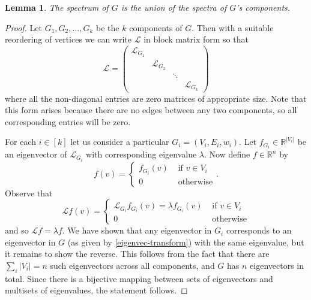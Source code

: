 \documentclass[a4paper,11pt]{article}
\newtheorem{lemma}[theorem]{Lemma}
\theoremstyle{definition}
\newcommand{\R}{\mathbb{R}}
\renewcommand{\L}{\mathcal{L}}
\begin{document}
\begin{lemma}\label{spectrum-union}
The spectrum of $G$ is the union of the spectra of $G$'s components.
\end{lemma}
\begin{proof}
Let $G_1, G_2, \dots, G_k$ be the $k$ components of $G$. Then with a suitable reordering of vertices we can write $\L$ in block matrix form so that
\[
\L = \begin{pmatrix}\L_{G_1} \\ & \L_{G_2} \\ & & \ddots \\ & & & \L_{G_k} \end{pmatrix}
\]
where all the non-diagonal entries are zero matrices of appropriate size. Note that this form arises because there are no edges between any two components, so all corresponding entries will be zero.

For each $i \in [k]$ let us consider a particular $G_i = (V_i, E_i, w_i)$. Let $f_{G_i} \in \R^{|V_i|}$ be an eigenvector of $\L_{G_i}$ with corresponding eigenvalue $\lambda$. Now define $f \in \R^n$ by
\begin{equation}\label{eigenvec-transform}
f(v) = \begin{cases}
f_{G_i}(v) &\text { if } v \in V_i \\
0 &\text { otherwise}
\end{cases}.
\end{equation}
Observe that 
\[
\L f(v) = \begin{cases}
\L_{G_i} f_{G_i}(v) = \lambda f_{G_i}(v) &\text { if } v \in V_i \\
0 &\text { otherwise}
\end{cases}
\]
and so $\L f = \lambda f$. We have shown that any eigenvector in $G_i$ corresponds to an eigenvector in $G$  (as given by \eqref{eigenvec-transform}) with the same eigenvalue, but it remains to show the reverse. This follows from the fact that there are $\sum_i |V_i| = n$ such eigenvectors across all components, and $G$ has $n$ eigenvectors in total. Since there is a bijective mapping between sets of eigenvectors and multisets of eigenvalues, the statement follows.
\end{proof}
\end{document}
